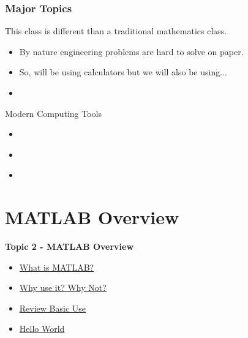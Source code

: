 \documentclass[fleqn]{beamer} %
\newcommand{\sectionIItitle}{MATLAB Overview}
\newcommand{\sectionIsubsectionIVtitle}{Major Topics}
\newcommand{\sectionIIsubsectionItitle}{What is MATLAB?}
\newcommand{\sectionIIsubsectionIItitle}{Why use it? Why Not?}
\newcommand{\sectionIIsubsectionIIItitle}{Review Basic Use}
\newcommand{\sectionIIsubsectionIVtitle}{Hello World}
\begin{document}
			\begin{frame}
				\frametitle{\sectionIsubsectionIVtitle}
				\bigskip

				This class is different than a traditional mathematics class.\\ 
				\begin{itemize}
					\item By nature engineering problems are hard to solve on paper.\\
					\item So, will be using calculators but we will also be using...\\
					\item \hspace{1mm} \vspace{10mm}\\
				\end{itemize}
				
		 		Modern Computing Tools\\ 		
				\begin{itemize}
					\item  \hspace{1mm} \vspace{5mm}\\
					\item  \hspace{1mm} \vspace{5mm}\\
					\item  \hspace{1mm} \vspace{5mm}\\
				\end{itemize}

				\btVFill
			\end{frame}
	
	\section{\sectionIItitle}\label{sectionII}

		\begin{frame}
			\large \textbf{Topic 2 - \sectionIItitle} \vspace{3mm}\\

			\begin{itemize}
				\item \hyperlink{sectionIIsubsectionI}{\sectionIIsubsectionItitle} \vspc %
				\item \hyperlink{sectionIIsubsectionII}{\sectionIIsubsectionIItitle} \vspc %
				\item \hyperlink{sectionIIsubsectionIII}{\sectionIIsubsectionIIItitle} \vspc %
				\item \hyperlink{sectionIIsubsectionIV}{\sectionIIsubsectionIVtitle} \vspc %
			\end{itemize}

		\end{frame}
\end{document}
